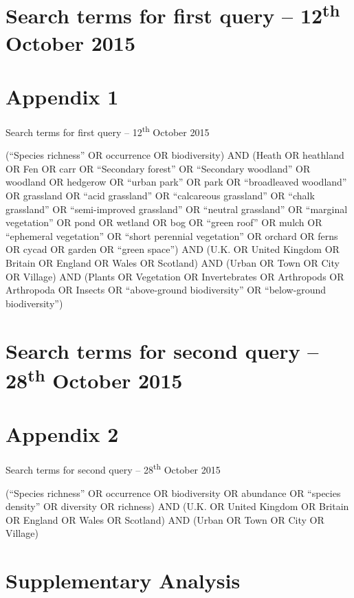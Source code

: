 
\ifappendixStyle %
\section{Search terms for first query -- 12\textsuperscript{th} October 2015} %
\label{txt:wlg-appendix1}
\else
\section*{Appendix 1}
Search terms for first query -- 12\textsuperscript{th} October 2015
\fi

(``Species richness'' OR occurrence OR biodiversity) AND (Heath OR heathland OR Fen OR carr OR ``Secondary forest'' OR ``Secondary woodland'' OR woodland OR hedgerow OR ``urban park'' OR park OR ``broadleaved woodland'' OR grassland OR ``acid grassland'' OR ``calcareous grassland'' OR ``chalk grassland'' OR ``semi-improved grassland'' OR ``neutral grassland'' OR ``marginal vegetation'' OR pond OR wetland OR bog OR ``green roof'' OR mulch OR ``ephemeral vegetation'' OR ``short perennial vegetation'' OR orchard OR ferns OR cycad OR garden OR ``green space'') AND (U.K. OR United Kingdom OR Britain OR England OR Wales OR Scotland) AND (Urban OR Town OR City OR Village) AND (Plants OR Vegetation OR Invertebrates OR Arthropods OR Arthropoda OR Insects OR ``above-ground biodiversity'' OR ``below-ground biodiversity'')

\ifappendixStyle %
\section{Search terms for second query -- 28\textsuperscript{th} October 2015} %
\label{txt:wlg-appendix2}
\else
\section*{Appendix 2}
Search terms for second query -- 28\textsuperscript{th} October 2015
\fi

(``Species richness'' OR occurrence OR biodiversity OR abundance OR ``species density'' OR diversity OR richness) AND (U.K. OR United Kingdom OR Britain OR England OR Wales OR Scotland) AND (Urban OR Town OR City OR Village)

\ifappendixStyle %
\section{Supplementary Analysis} %
\label{txt:wlg-appendix3}
\else
